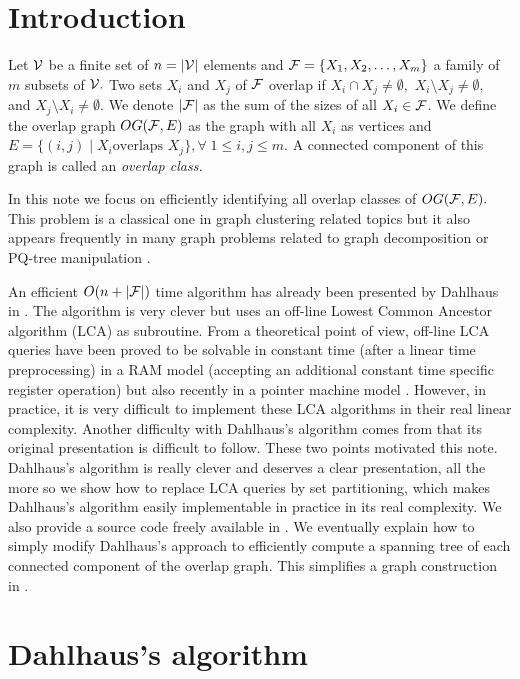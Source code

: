 \documentclass{llncs}
\begin{document}
\section{Introduction}  
\label{sec:intro}  

Let ${\cal V}$ be a finite set of $n=|{\cal V}|$ elements and ${\cal
  F}=\{X_1,X_2, \ldots , X_m\}$ a family of $m$ subsets of ${\cal V}.$
Two sets $X_i$ and $X_j$ of ${\cal F}$ overlap if $X_i \cap X_j \neq
\emptyset,$ $X_i \setminus X_j \neq \emptyset,$ and $X_j \setminus X_i
\neq \emptyset.$ We denote $|{\cal F}|$ as the sum of the sizes of all
$X_i \in {\cal F}$. We define the overlap graph $OG({\cal F},E)$ as the
graph with all $X_i$ as vertices and $E=\{(i,j)\; |\; X_i \mbox{
  overlaps } X_j\}, \forall \; 1 \leq i,j \leq m.$ A connected
component of this graph is called an {\em overlap class.}

In this note we focus on efficiently identifying all overlap classes of
$OG({\cal F},E).$ This problem is a classical one in graph clustering
related topics but it also appears frequently in many graph problems
related to graph decomposition \cite{Dahlhaus00} or PQ-tree
manipulation \cite{McConnell04}.

An efficient $O(n+|{\cal F}|)$ time algorithm has already been
presented by Dahlhaus in \cite{Dahlhaus00}. The algorithm is very
clever but uses an off-line Lowest Common Ancestor algorithm (LCA) as
subroutine. From a theoretical point of view, off-line LCA queries
have been proved to be solvable in constant time (after a linear time
preprocessing) in a RAM model (accepting an additional constant time
specific register operation) but also recently in a pointer machine
model \cite{BKRW98}. However, in practice, it is very difficult to
implement these LCA algorithms in their real linear
complexity. Another difficulty with Dahlhaus's algorithm comes from
that its original presentation is difficult to follow. These two
points motivated this note. Dahlhaus's algorithm is really clever and
deserves a clear presentation, all the more so we show how to replace
LCA queries by set partitioning, which makes Dahlhaus's algorithm
easily implementable in practice in its real complexity. We also
provide a source code freely available in \cite{OurImpl07}. We
eventually explain how to simply modify Dahlhaus's approach to
efficiently compute a spanning tree of each connected component of the
overlap graph. This simplifies a graph construction in
\cite{McConnell04}.

\section{Dahlhaus's algorithm}
\label{dahlhausalgorithm}
\end{document}
